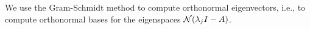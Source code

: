 \documentclass{article}
\providecommand{\real}[1]{\mathbb{R}}
\begin{document}
%
%
%


We use the Gram-Schmidt method to compute orthonormal eigenvectors, i.e., to compute orthonormal
bases for the eigenspaces  $  {\cal N}(\lambda_j I - A)$.
\end{document}
